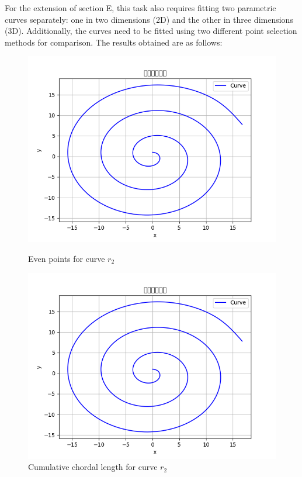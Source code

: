 \documentclass[a4paper]{article}
\begin{document}
For the extension of section E, this task also requires fitting two parametric curves separately: one in two dimensions (2D) and the other in three dimensions (3D). Additionally, the curves need to be fitted using two different point selection methods for comparison. The results obtained are as follows:
\begin{figure}[h]
    \centering
    \begin{minipage}{0.45\textwidth}
        \centering
        \includegraphics[width=\linewidth]{../figure/r2_even.png}
        \caption{Even points for curve \(r_2\)}
    \end{minipage}%
    \hfill
    \begin{minipage}{0.45\textwidth}
        \centering
        \includegraphics[width=\linewidth]{../figure/r2_CCL.png}
        \caption{Cumulative chordal length for curve \(r_2\)}
    \end{minipage}
\end{figure}
\end{document}
